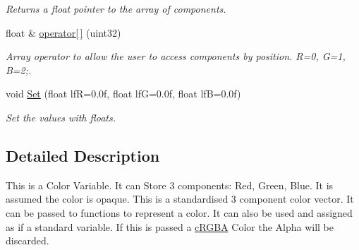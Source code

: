 \begin{DoxyCompactItemize}
\begin{DoxyCompactList}\small\item\em Returns a float pointer to the array of components. \end{DoxyCompactList}\item 
\hypertarget{classc_r_g_b_ad24f57ecec4046a4580436f2c63462cb}{
float \& \hyperlink{classc_r_g_b_ad24f57ecec4046a4580436f2c63462cb}{operator\mbox{[}$\,$\mbox{]}} (uint32)}
\label{classc_r_g_b_ad24f57ecec4046a4580436f2c63462cb}

\begin{DoxyCompactList}\small\item\em Array operator to allow the user to access components by position. R=0, G=1, B=2;. \end{DoxyCompactList}\item 
\hypertarget{classc_r_g_b_a59ec50d713ed372b57125ef1f5c58d06}{
void \hyperlink{classc_r_g_b_a59ec50d713ed372b57125ef1f5c58d06}{Set} (float lfR=0.0f, float lfG=0.0f, float lfB=0.0f)}
\label{classc_r_g_b_a59ec50d713ed372b57125ef1f5c58d06}

\begin{DoxyCompactList}\small\item\em Set the values with floats. \end{DoxyCompactList}\end{DoxyCompactItemize}


\subsection{Detailed Description}
This is a Color Variable. It can Store 3 components: Red, Green, Blue. It is assumed the color is opaque. This is a standardised 3 component color vector. It can be passed to functions to represent a color. It can also be used and assigned as if a standard variable. If this is passed a \hyperlink{classc_r_g_b_a}{cRGBA} Color the Alpha will be discarded. 